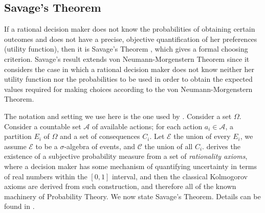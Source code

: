 \documentclass{svjour3}                     %
\begin{document}
\subsection{Savage's Theorem}
\label{savage_theorem}
If a rational decision maker does not know the probabilities of obtaining certain outcomes and does not have a precise, objective quantification of her preferences (utility function), then it is Savage's Theorem \citep{savage1954the}, which gives a formal choosing criterion. Savage's result extends von Neumann-Morgenstern Theorem since it considers the case in which a rational decision maker does not know neither her utility function nor the probabilities to be used in order to obtain the expected values required for making choices according to the von Neumann-Morgenstern Theorem. 

The notation and setting we use here is the one used by \cite{bernardo2000bayesian}. Consider a set $\Omega$. Consider a countable set $\mathcal{A}$ of available actions; for each action $a_i \in \mathcal{A}$, a partition $E_i$ of $\Omega$ and a set of consequences $C_i$. Let $\mathcal{E}$ the union of every $E_i$, we assume $\mathcal{E}$ to be a $\sigma$-algebra of events, and $\mathcal{C}$ the union of all $C_i$. \cite{bernardo2000bayesian} derives the existence of a subjective probability measure from a set of \textit{rationality axioms}, where a decision maker has some mechanism of quantifying uncertainty in terms of real numbers within the $[0,1]$ interval, and then the classical Kolmogorov axioms are derived from such construction, and therefore all of the known machinery of Probability Theory. We now state Savage's Theorem. Details can be found in \citep{savage1954the,kreps1988choice,bernardo2000bayesian,gilboa2009decision}.
\end{document}
